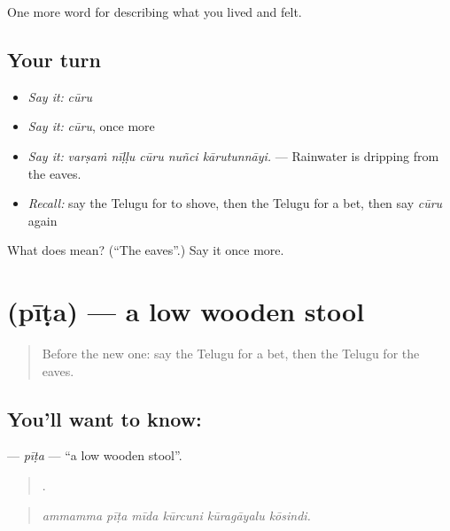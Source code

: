 \begin{grammarlens}[title={What you've built}]
One more word for describing what you lived and felt.
\end{grammarlens}

\subsection*{Your turn}
\begin{itemize}
\raggedright
  \item \emph{Say it:} \emph{cūru}
  \item \emph{Say it:} \emph{cūru}, once more
  \item \emph{Say it:} \emph{varṣaṁ nīḷḷu cūru nuñci kārutunnāyi.} — Rainwater is dripping from the eaves.
  \item \emph{Recall:} say the Telugu for to shove, then the Telugu for a bet, then say \emph{cūru} again
\end{itemize}

\begin{tcolorbox}[breakable,colback=teal!4,colframe=teal!35!black,title={Before you move on}]
What does  mean? (\textquotedblleft{}The eaves\textquotedblright{}.) Say it once more.
\end{tcolorbox}
\section[\texorpdfstring{\te{పీట} (pīṭa)}{పీట (pīṭa)}]{ (pīṭa) — a low wooden stool}

\label{lesson:TE-C546-pita}



\begin{quote}
Before the new one: say the Telugu for a bet, then the Telugu for the eaves.
\end{quote}

\subsection*{You'll want to know: }
\textbf{} — \emph{pīṭa} — \textquotedblleft{}a low wooden stool\textquotedblright{}.

\begin{quote}
     .
\end{quote}

\begin{quote}
\emph{ammamma pīṭa mīda kūrcuni kūragāyalu kōsindi.}
\end{quote}

